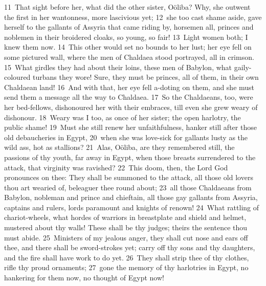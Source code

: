 \documentclass[10pt]{book} %
\begin{document}
\textcolor{benred8}{11}~That sight before her, what did the other sister, O\"{o}liba? Why, she outwent the first in her wantonness, more lascivious yet; \textcolor{benred8}{12}~she too cast shame aside, gave herself to the gallants of Assyria that came riding by, horsemen all, princes and noblemen in their broidered cloaks, so young, so fair! \textcolor{benred8}{13}~Light women both; I knew them now. \textcolor{benred8}{14}~This other would set no bounds to her lust; her eye fell on some pictured wall, where the men of Chaldaea stood portrayed, all in crimson. \textcolor{benred8}{15}~What girdles they had about their loins, these men of Babylon, what gaily-coloured turbans they wore! Sure, they must be princes, all of them, in their own Chaldaean land! \textcolor{benred8}{16}~And with that, her eye fell a-doting on them, and she must send them a message all the way to Chaldaea. \textcolor{benred8}{17}~So the Chaldaeans, too, were her bed-fellows, dishonoured her with their embraces, till even she grew weary of dishonour. \textcolor{benred8}{18}~Weary was I too, as once of her sister; the open harlotry, the public shame! \textcolor{benred8}{19}~Must she still renew her unfaithfulness, hanker still after those old debaucheries in Egypt, \textcolor{benred8}{20}~when she was love-sick for gallants lusty as the wild ass, hot as stallions?
\textcolor{benred8}{21}~Alas, O\"{o}liba, are they remembered still, the passions of thy youth, far away in Egypt, when those breasts surrendered to the attack, that virginity was ravished? \textcolor{benred8}{22}~This doom, then, the Lord God pronounces on thee: They shall be summoned to the attack, all those old lovers thou art wearied of, beleaguer thee round about; \textcolor{benred8}{23}~all those Chaldaeans from Babylon, nobleman and prince and chieftain, all those gay gallants from Assyria, captains and rulers, lords paramount and knights of renown! \textcolor{benred8}{24}~What rattling of chariot-wheels, what hordes of warriors in breastplate and shield and helmet, mustered about thy walls! These shall be thy judges; theirs the sentence thou must abide. \textcolor{benred8}{25}~Ministers of my jealous anger, they shall cut nose and ears off thee, and there shall be sword-strokes yet; carry off thy sons and thy daughters, and the fire shall have work to do yet. \textcolor{benred8}{26}~They shall strip thee of thy clothes, rifle thy proud ornaments; \textcolor{benred8}{27}~gone the memory of thy harlotries in Egypt, no hankering for them now, no thought of Egypt now!
\end{document}
